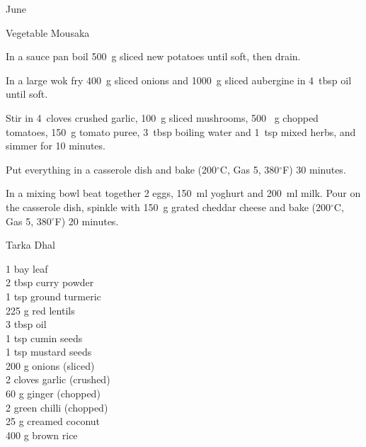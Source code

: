 \begin{menu}{June}
\begin{recipe}{2}{Vegetable Mousaka}
    \begin{instructions}
    \item 
        In a sauce pan boil
        500~g sliced new potatoes
        until soft,
        then drain.
      \item 
        In a large wok fry
        400~g sliced onions
        and
        1000~g sliced aubergine
        in
        4~tbsp  oil
        until soft.
      \item 
        Stir in
        4~cloves crushed garlic,
        100~g sliced mushrooms,
        500 ~g chopped tomatoes,
        150~g  tomato puree,
        3~tbsp  boiling water
        and
        1~tsp  mixed herbs,
        and simmer for 10 minutes.
      \item 
        Put everything in a casserole dish
        and bake (200$^{\circ}$C, Gas 5, 380$^{\circ}$F) 30 minutes.
      \item 
        In a mixing bowl beat together
        2  eggs,
        150~ml  yoghurt
        and
        200~ml  milk.
        Pour on the casserole dish, spinkle with
        150~g grated cheddar cheese
        and bake (200$^{\circ}$C, Gas 5, 380$^{\circ}$F) 20 minutes.
      
    \end{instructions}
    \end{recipe}%
  
    \begin{recipe}{2}{Tarka Dhal}%
		\begin{ingredients}
		1  bay leaf  \\
	2 tbsp curry powder  \\
	1 tsp ground turmeric  \\
	225 g red lentils  \\
	3 tbsp oil  \\
	1 tsp cumin seeds  \\
	1 tsp mustard seeds  \\
	200 g onions (sliced) \\
	2 cloves garlic (crushed) \\
	60 g ginger (chopped) \\
	2  green chilli (chopped) \\
	25 g creamed coconut  \\
	400 g brown rice  \\
	
		\end{ingredients}
	
	

\end{recipe}
\end{menu}
